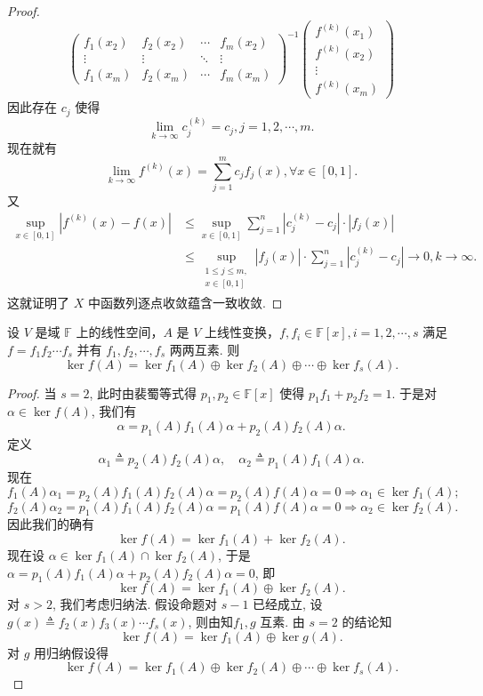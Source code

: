 \documentclass[../../main.tex]{subfiles}
\begin{document}
\begin{proof}
\[\begin{pmatrix}
f_1(x_2) & f_2(x_2) & \cdots & f_m(x_2) \\
\vdots & \vdots & \ddots & \vdots \\
f_1(x_m) & f_2(x_m) & \cdots & f_m(x_m)
\end{pmatrix}^{-1}
\begin{pmatrix}
f^{(k)}(x_1) \\
f^{(k)}(x_2) \\
\vdots \\
f^{(k)}(x_m)
\end{pmatrix}
\]
因此存在 \( c_j \) 使得
\[
\lim_{k \to \infty} c_j^{(k)} = c_j, j = 1, 2, \cdots, m.
\]
现在就有
\[
\lim_{k \to \infty} f^{(k)}(x) = \sum_{j=1}^m c_j f_j(x), \forall x \in [0,1].
\]
又
\[
\begin{aligned}
\sup_{x \in [0,1]} \left| f^{(k)}(x) - f(x) \right| &\leqslant \sup_{x \in [0,1]} \sum_{j=1}^n \left| c_j^{(k)} - c_j \right| \cdot \left| f_j(x) \right| \\
&\leqslant \sup_{\substack{1 \leqslant j \leqslant m, \\ x \in [0,1]}} \left| f_j(x) \right| \cdot \sum_{j=1}^n \left| c_j^{(k)} - c_j \right| \to 0, k \to \infty.
\end{aligned}
\]
这就证明了 \( X \) 中函数列逐点收敛蕴含一致收敛.
\end{proof}

\begin{theorem}\label{theorem:线性变换互素分解对应核子空间直和分解}
设 $V$ 是域 $\mathbb{F}$ 上的线性空间，$A$ 是 $V$ 上线性变换，$f, f_i \in \mathbb{F}[x], i = 1,2,\cdots, s$ 满足 $f = f_1f_2\cdots f_s$ 并有 $f_1, f_2, \cdots, f_s$ 两两互素. 则
$$\ker f(A) = \ker f_1(A) \oplus \ker f_2(A) \oplus \cdots \oplus \ker f_s(A).$$
\end{theorem}
\begin{proof}
当 $s = 2$, 此时由裴蜀等式得 $p_1, p_2 \in \mathbb{F}[x]$ 使得 $p_1f_1 + p_2f_2 = 1$. 于是对 $\alpha \in \ker f(A)$, 我们有
$$\alpha = p_1(A)f_1(A)\alpha + p_2(A)f_2(A)\alpha.$$
定义
$$\alpha_1 \triangleq p_2(A)f_2(A)\alpha,\quad \alpha_2 \triangleq p_1(A)f_1(A)\alpha.$$
现在
$$f_1(A)\alpha_1 = p_2(A)f_1(A)f_2(A)\alpha = p_2(A)f(A)\alpha = 0 \Rightarrow \alpha_1 \in \ker f_1(A);$$
$$f_2(A)\alpha_2 = p_1(A)f_1(A)f_2(A)\alpha = p_1(A)f(A)\alpha = 0 \Rightarrow \alpha_2 \in \ker f_2(A).$$
因此我们的确有
$$\ker f(A) = \ker f_1(A) + \ker f_2(A).$$
现在设 $\alpha \in \ker f_1(A) \cap \ker f_2(A)$, 于是 $\alpha = p_1(A)f_1(A)\alpha + p_2(A)f_2(A)\alpha = 0$, 即
$$\ker f(A) = \ker f_1(A) \oplus \ker f_2(A).$$
对 $s > 2$, 我们考虑归纳法. 假设命题对 $s - 1$ 已经成立, 设 $g(x) \triangleq f_2(x)f_3(x)\cdots f_s(x)$, 则由知$f_1, g$ 互素. 由 $s = 2$ 的结论知
$$\ker f(A) = \ker f_1(A) \oplus \ker g(A).$$
对 $g$ 用归纳假设得
$$\ker f(A) = \ker f_1(A) \oplus \ker f_2(A) \oplus \cdots \oplus \ker f_s(A).$$
\end{proof}
\end{document}
